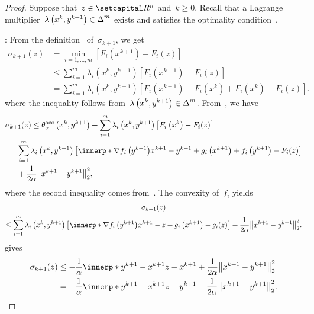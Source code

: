 \documentclass[../main]{subfiles}
\begin{document}
\begin{proof}
    Suppose that~$z \in \setR^n$ and~$k \ge 0$.
    Recall that a Lagrange multiplier~$\lambda\left( x^k, y^{k + 1} \right) \in \operatorname{\Delta}^m$ exists and satisfies the optimality condition~.

    :
    From the definition~ of~$\sigma_{k + 1}$, we get
    \begin{align}
        \sigma_{k + 1}(z) & = \min_{i = 1, \dots, m} \left[ F_i\left(x^{k + 1}\right) - F_i(z) \right]                                                                                  \\
                          & \le \sum_{i = 1}^m \lambda_i\left( x^k, y^{k + 1} \right) \left[ F_i\left(x^{k + 1}\right) - F_i(z) \right]                                                 \\
                          & = \sum_{i = 1}^{m} \lambda_i\left( x^k, y^{k + 1} \right) \left[ F_i\left(x^{k + 1}\right) - F_i\left( x^k \right) + F_i\left( x^k \right) - F_i(z) \right]
        .\end{align}
    where the inequality follows from~$\lambda\left( x^k, y^{k + 1} \right) \in \operatorname{\Delta}^m$.
    From~, we have
    \begin{align}
        \MoveEqLeft[1.5] \sigma_{k + 1}(z) \le \theta^\acc_\alpha\left( x^k, y^{k + 1} \right) + \sum_{i = 1}^{m} \lambda_i\left( x^k, y^{k + 1} \right) \left[ F_i\left( x^k \right) - F_i(z) \right]                         \\
        ={} & \sum_{i = 1}^{m} \lambda_i\left( x^k, y^{k + 1} \right) \left[ \innerp*{\nabla f_i\left( y^{k + 1} \right) }{x^{k + 1} - y^{k + 1}} + g_i\left( x^{k + 1} \right) + f_i\left( y^{k + 1} \right) - F_i(z) \right] \\
            & + \frac{1}{2 \alpha} \norm*{x^{k + 1} - y^{k + 1}}_2^2
        ,\end{align}
    where the second inequality comes from~.
    The convexity of~$f_i$ yields
    \begin{multline}
        \sigma_{k + 1}(z) \\
        \le \sum_{i = 1}^{m} \lambda_i\left( x^k, y^{k + 1} \right) \left[ \innerp*{\nabla f_i\left( y^{k + 1} \right) }{x^{k + 1} - z} + g_i\left( x^{k + 1} \right) - g_i(z) \right] + \frac{1}{2 \alpha} \norm*{x^{k + 1} - y^{k + 1}}_2^2
        .\end{multline}
     gives
    \begin{align}
        \sigma_{k + 1}(z) & \le - \frac{1}{\alpha} \innerp*{y^{k + 1} - x^{k + 1}}{z - x^{k + 1}} + \frac{1}{2 \alpha} \norm*{x^{k + 1} - y^{k + 1}}_2^2 \\
                          & = - \frac{1}{\alpha} \innerp*{y^{k + 1} - x^{k + 1}}{z - y^{k + 1}} - \frac{1}{2 \alpha} \norm*{x^{k + 1} - y^{k + 1}}_2^2
        .\end{align}


\end{proof}
\end{document}
